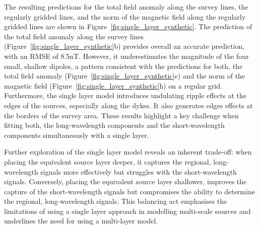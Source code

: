 The resulting predictions for the total field anomaly along the survey lines, the regularly gridded lines, and the norm of the magnetic field along the regularly gridded lines are shown in Figure~\ref{fig:single_layer_synthetic}. The prediction of the total field anomaly along the survey lines (Figure~\ref{fig:single_layer_synthetic}b) provides overall an accurate prediction, with an RMSE of 8.5nT. However, it underestimates the magnitude of the four small, shallow dipoles, a pattern consistent with the predictions for both, the total field anomaly (Figure~\ref{fig:single_layer_synthetic}e) and the norm of the magnetic field (Figure~\ref{fig:single_layer_synthetic}h) on a regular grid. Furthermore, the single layer model introduces undulating ripple effects at the edges of the sources, especially along the dykes. It also generates edges effects at the borders of the survey area. These results highlight a key challenge when fitting both, the long-wavelength components and the short-wavelength components simultaneously with a single layer.

Further exploration of the single layer model reveals an inherent trade-off: when placing the equivalent source layer deeper, it captures the regional, long-wavelength signals more effectively but struggles with the short-wavelength signals. Conversely, placing the equivalent source layer shallower, improves the capture of the short-wavelength signals but compromises the ability to determine the regional, long-wavelength signals. This balancing act emphasises the limitations of using a single layer approach in modelling multi-scale sources and underlines the need for using a multi-layer model.
\clearpage

